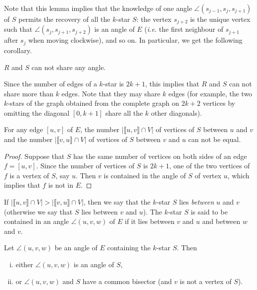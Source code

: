 \documentclass[12pt]{amsart}
\begin{document}
Note that this lemma implies that the knowledge of one angle $\angle(s_{j-1},s_j,s_{j+1})$ of $S$ permits the recovery of all the $k$-star $S$: the vertex $s_{j+2}$ is the unique vertex such that $\angle(s_j,s_{j+1},s_{j+2})$ is an angle of $E$ ({\it i.e.} the first neighbour of $s_{j+1}$ after $s_j$ when moving clockwise), and so on.
In particular, we get the following corollary.

\begin{corollary}
$R$ and $S$ can not share any angle.
\end{corollary}

Since the number of edges of a $k$-star is $2k+1$, this implies that $R$ and $S$ can not share more than $k$ edges. Note that they may share $k$ edges (for example, the two $k$-stars of the graph obtained from the complete graph on $2k+2$ vertices by omitting the diagonal $[0,k+1]$ share all the $k$  other diagonals).

\begin{corollary}
For any edge $[u,v]$ of $E$, the number $|\llbracket u,v\rrbracket\cap V|$ of vertices of $S$ between $u$ and $v$ and the number $|\llbracket v,u\rrbracket\cap V|$ of vertices of $S$ between $v$ and $u$ can not be equal.
\end{corollary}

\begin{proof}
Suppose that $S$ has the same number of vertices on both sides of an edge $f=[u,v]$. Since the number of vertices of $S$ is $2k+1$, one of the two vertices of $f$ is a vertex of $S$, say $u$. Then $v$ is contained in the angle of $S$ of vertex $u$, which implies that $f$ is not in $E$.
\end{proof}

If $|\llbracket u,v\rrbracket\cap V|>|\llbracket v,u\rrbracket\cap V|$, then we say that the $k$-star $S$ lies \emph{between} $u$ and $v$ (otherwise we say that $S$ lies between $v$ and $u$). 
The $k$-star $S$ is said to be contained in an angle $\angle(u,v,w)$ of $E$ if it lies between $v$ and $u$ and between $w$ and $v$.

\begin{lemma}
Let $\angle(u,v,w)$ be an angle of $E$ containing the $k$-star $S$. Then
\begin{enumerate}[(i)]
\item either $\angle(u,v,w)$ is an angle of $S$,
\item or $\angle(u,v,w)$ and $S$ have a common bisector (and $v$ is not a vertex of $S$).
\end{enumerate}
\end{lemma}
\end{document}
